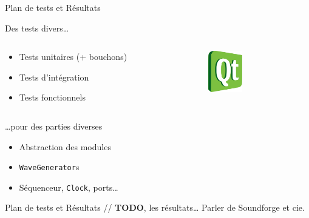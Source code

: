 \documentclass[frenchb]{beamer}
\begin{document}
\begin{frame}{Plan de tests et Résultats}
    \begin{block}{Des tests divers\ldots{}}
        \begin{columns}
            \begin{column}[l]{6cm}
                \begin{itemize}
                    \item Tests unitaires (+ bouchons)
                    \item Tests d'intégration
                    \item Tests fonctionnels
                \end{itemize}
            \end{column}
            \begin{column}[r]{5cm}
                \begin{center}
                    \includegraphics[width=1.5cm]{../img/ps/Qt.pdf}
                \end{center}
            \end{column}
        \end{columns}
    \end{block}

    \begin{block}{\centering \ldots{}pour des parties diverses}
        \begin{itemize}
            \item Abstraction des modules
            \item \texttt{WaveGenerator}s
            \item Séquenceur, \texttt{Clock}, ports\ldots{}
        \end{itemize}
    \end{block}
\end{frame}

\begin{frame}{Plan de tests et Résultats}
  // \textbf{TODO}, les résultats\ldots{} Parler de Soundforge et cie.
\end{frame}
\end{document}
